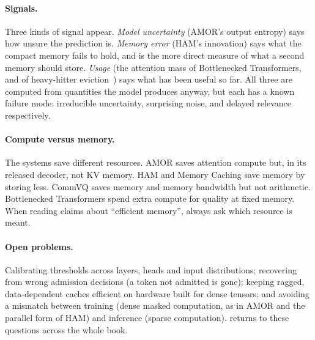 \paragraph{Signals.} Three kinds of signal appear. \emph{Model uncertainty} (AMOR's output entropy)
says how unsure the prediction is. \emph{Memory error} (HAM's innovation) says what the compact memory
fails to hold, and is the more direct measure of what a second memory should store. \emph{Usage} (the
attention mass of Bottlenecked Transformers, and of heavy-hitter eviction~\citep{c13-zhang2023h2o}) says
what has been useful so far. All three are computed from quantities the model produces anyway, but each
has a known failure mode: irreducible uncertainty, surprising noise, and delayed relevance respectively.

\paragraph{Compute versus memory.} The systems save different resources. AMOR saves attention compute
but, in its released decoder, not KV memory. HAM and Memory Caching save memory by storing less.
CommVQ saves memory and memory bandwidth but not arithmetic. Bottlenecked Transformers spend extra
compute for quality at fixed memory. When reading claims about ``efficient memory'', always ask which
resource is meant.

\paragraph{Open problems.} Calibrating thresholds across layers, heads and input distributions;
recovering from wrong admission decisions (a token not admitted is gone); keeping ragged,
data-dependent caches efficient on hardware built for dense tensors; and avoiding a mismatch between
training (dense masked computation, as in AMOR and the parallel form of HAM) and inference (sparse
computation).  returns to these questions across the whole book.

